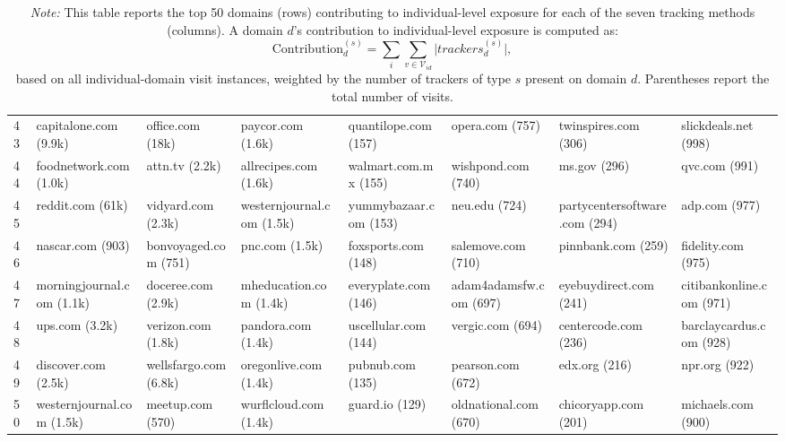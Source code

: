 \documentclass[12pt, letterpaper]{article}
\begin{document}
\begin{table}[ht]
\begin{adjustbox}{max width=\textwidth}
\begin{tabular}{@{\hspace{0\tabcolsep}}llllllll@{\hspace{0\tabcolsep}}}
43 & capitalone.com (9.9k) & office.com (18k) & paycor.com (1.6k) & quantilope.com (157) & opera.com (757) & twinspires.com (306) & slickdeals.net (998) \\
44 & foodnetwork.com (1.0k) & attn.tv (2.2k) & allrecipes.com (1.6k) & walmart.com.mx (155) & wishpond.com (740) & ms.gov (296) & qvc.com (991) \\
45 & reddit.com (61k) & vidyard.com (2.3k) & westernjournal.com (1.5k) & yummybazaar.com (153) & neu.edu (724) & partycentersoftware.com (294) & adp.com (977) \\
46 & nascar.com (903) & bonvoyaged.com (751) & pnc.com (1.5k) & foxsports.com (148) & salemove.com (710) & pinnbank.com (259) & fidelity.com (975) \\
47 & morningjournal.com (1.1k) & doceree.com (2.9k) & mheducation.com (1.4k) & everyplate.com (146) & adam4adamsfw.com (697) & eyebuydirect.com (241) & citibankonline.com (971) \\
48 & ups.com (3.2k) & verizon.com (1.8k) & pandora.com (1.4k) & uscellular.com (144) & vergic.com (694) & centercode.com (236) & barclaycardus.com (928) \\
49 & discover.com (2.5k) & wellsfargo.com (6.8k) & oregonlive.com (1.4k) & pubnub.com (135) & pearson.com (672) & edx.org (216) & npr.org (922) \\
50 & westernjournal.com (1.5k) & meetup.com (570) & wurflcloud.com (1.4k) & guard.io (129) & oldnational.com (670) & chicoryapp.com (201) & michaels.com (900) \\

      \bottomrule
   \end{tabular}
\end{adjustbox}
\par\endgroup
\caption*{
    \footnotesize \textit{Note:}
    This table reports the top 50 domains (rows) contributing to individual-level exposure for each of the seven tracking methods (columns).
    A domain $d$'s contribution to individual-level exposure is computed as:
    \begin{equation*}
    \text{Contribution}_d^{(s)} = 
    \sum_{i} \sum_{v \in \mathcal{V}_{id}} 
    \vert trackers^{(s)}_d \vert,
    \end{equation*}
    based on all individual-domain visit instances, weighted by the number of trackers of type $s$ present on domain $d$.
    Parentheses report the total number of visits.
}
\end{table}


\end{document}
